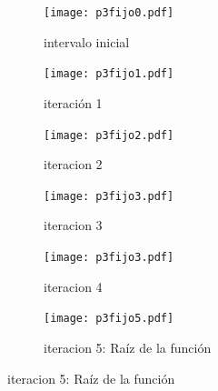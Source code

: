 \begin{figure}[H]
	\centering
	\begin{subfigure}{0.4\textwidth}
		{\texttt{[image: p3fijo0.pdf]}}
		\caption{intervalo inicial}
	\end{subfigure}
	\begin{subfigure}{0.4\textwidth}
		{\texttt{[image: p3fijo1.pdf]}}
		\caption{iteración 1}
	\end{subfigure}	
	\begin{subfigure}{0.4\textwidth}
		{\texttt{[image: p3fijo2.pdf]}}
		\caption{iteracion 2}
	\end{subfigure}
	\begin{subfigure}{0.4\textwidth}
		{\texttt{[image: p3fijo3.pdf]}}
		\caption{iteracion 3}
	\end{subfigure}
	\begin{subfigure}{0.4\textwidth}
		{\texttt{[image: p3fijo3.pdf]}}
		\caption{iteracion 4}
	\end{subfigure}
	\begin{subfigure}{0.4\textwidth}
		{\texttt{[image: p3fijo5.pdf]}}
		\caption{iteracion 5: Raíz de la función}
	\end{subfigure}
	\label{fig:pfijo5}
\end{figure}

%

